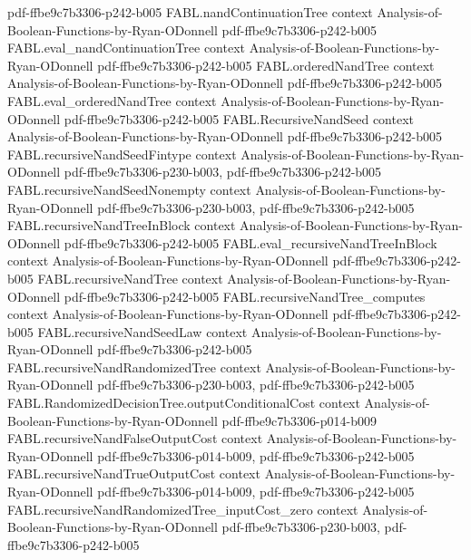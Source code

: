 \begin{theorem}
  {pdf-ffbe9c7b3306-p242-b005}
\proofstep
  {FABL.nandContinuationTree}
  {context}
  {Analysis-of-Boolean-Functions-by-Ryan-ODonnell}
  {pdf-ffbe9c7b3306-p242-b005}
\proofstep
  {FABL.eval_nandContinuationTree}
  {context}
  {Analysis-of-Boolean-Functions-by-Ryan-ODonnell}
  {pdf-ffbe9c7b3306-p242-b005}
\proofstep
  {FABL.orderedNandTree}
  {context}
  {Analysis-of-Boolean-Functions-by-Ryan-ODonnell}
  {pdf-ffbe9c7b3306-p242-b005}
\proofstep
  {FABL.eval_orderedNandTree}
  {context}
  {Analysis-of-Boolean-Functions-by-Ryan-ODonnell}
  {pdf-ffbe9c7b3306-p242-b005}
\proofstep
  {FABL.RecursiveNandSeed}
  {context}
  {Analysis-of-Boolean-Functions-by-Ryan-ODonnell}
  {pdf-ffbe9c7b3306-p242-b005}
\proofstep
  {FABL.recursiveNandSeedFintype}
  {context}
  {Analysis-of-Boolean-Functions-by-Ryan-ODonnell}
  {pdf-ffbe9c7b3306-p230-b003,
    pdf-ffbe9c7b3306-p242-b005}
\proofstep
  {FABL.recursiveNandSeedNonempty}
  {context}
  {Analysis-of-Boolean-Functions-by-Ryan-ODonnell}
  {pdf-ffbe9c7b3306-p230-b003,
    pdf-ffbe9c7b3306-p242-b005}
\proofstep
  {FABL.recursiveNandTreeInBlock}
  {context}
  {Analysis-of-Boolean-Functions-by-Ryan-ODonnell}
  {pdf-ffbe9c7b3306-p242-b005}
\proofstep
  {FABL.eval_recursiveNandTreeInBlock}
  {context}
  {Analysis-of-Boolean-Functions-by-Ryan-ODonnell}
  {pdf-ffbe9c7b3306-p242-b005}
\proofstep
  {FABL.recursiveNandTree}
  {context}
  {Analysis-of-Boolean-Functions-by-Ryan-ODonnell}
  {pdf-ffbe9c7b3306-p242-b005}
\proofstep
  {FABL.recursiveNandTree_computes}
  {context}
  {Analysis-of-Boolean-Functions-by-Ryan-ODonnell}
  {pdf-ffbe9c7b3306-p242-b005}
\proofstep
  {FABL.recursiveNandSeedLaw}
  {context}
  {Analysis-of-Boolean-Functions-by-Ryan-ODonnell}
  {pdf-ffbe9c7b3306-p242-b005}
\proofstep
  {FABL.recursiveNandRandomizedTree}
  {context}
  {Analysis-of-Boolean-Functions-by-Ryan-ODonnell}
  {pdf-ffbe9c7b3306-p230-b003,
    pdf-ffbe9c7b3306-p242-b005}
\proofstep
  {FABL.RandomizedDecisionTree.outputConditionalCost}
  {context}
  {Analysis-of-Boolean-Functions-by-Ryan-ODonnell}
  {pdf-ffbe9c7b3306-p014-b009}
\proofstep
  {FABL.recursiveNandFalseOutputCost}
  {context}
  {Analysis-of-Boolean-Functions-by-Ryan-ODonnell}
  {pdf-ffbe9c7b3306-p014-b009,
    pdf-ffbe9c7b3306-p242-b005}
\proofstep
  {FABL.recursiveNandTrueOutputCost}
  {context}
  {Analysis-of-Boolean-Functions-by-Ryan-ODonnell}
  {pdf-ffbe9c7b3306-p014-b009,
    pdf-ffbe9c7b3306-p242-b005}
\proofstep
  {FABL.recursiveNandRandomizedTree_inputCost_zero}
  {context}
  {Analysis-of-Boolean-Functions-by-Ryan-ODonnell}
  {pdf-ffbe9c7b3306-p230-b003,
    pdf-ffbe9c7b3306-p242-b005}

\end{theorem}
